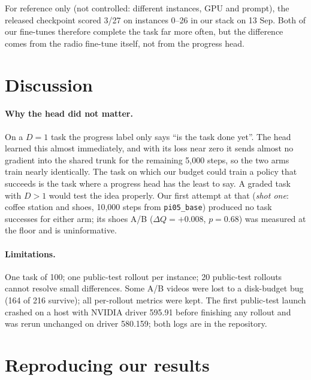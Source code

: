 \documentclass[10pt]{article}
\newcommand{\code}[1]{\texttt{#1}}
\begin{document}
For reference only (not controlled: different instances, GPU and prompt), the released
checkpoint scored 3/27 on instances 0--26 in our stack on 13 Sep. Both of our fine-tunes
therefore complete the task far more often, but the difference comes from the radio fine-tune
itself, not from the progress head.

\section{Discussion}

\paragraph{Why the head did not matter.}
On a $D=1$ task the progress label only says ``is the task done yet''. The head learned this
almost immediately, and with its loss near zero it sends almost no gradient into the shared
trunk for the remaining 5{,}000 steps, so the two arms train nearly identically. The task on
which our budget could train a policy that succeeds is the task where a progress head has the
least to say. A graded task with $D > 1$ would test the idea properly. Our first attempt at that
(\emph{shot one}: coffee station and shoes, 10{,}000 steps from \code{pi05\_base}) produced no
task successes for either arm; its shoes A/B ($\Delta Q = +0.008$, $p = 0.68$) was measured at
the floor and is uninformative.

\paragraph{Limitations.}
One task of 100; one public-test rollout per instance; 20 public-test rollouts cannot resolve
small differences. Some A/B videos were lost to a disk-budget bug (164 of 216 survive); all
per-rollout metrics were kept. The first public-test launch crashed on a host with NVIDIA
driver 595.91 before finishing any rollout and was rerun unchanged on driver 580.159; both
logs are in the repository.

\section{Reproducing our results}\label{sec:repro}
\end{document}
